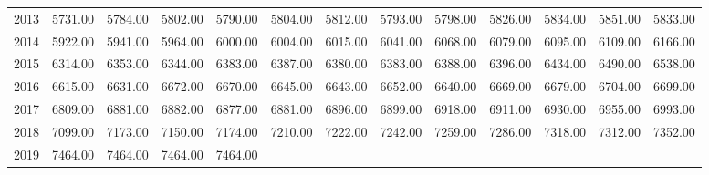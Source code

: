 \begin{longtable}{rrrrrrrrrrrrr}
  2013 & 5731.00 & 5784.00 & 5802.00 & 5790.00 & 5804.00 & 5812.00 & 5793.00 & 5798.00 & 5826.00 & 5834.00 & 5851.00 & 5833.00 \\ 
  2014 & 5922.00 & 5941.00 & 5964.00 & 6000.00 & 6004.00 & 6015.00 & 6041.00 & 6068.00 & 6079.00 & 6095.00 & 6109.00 & 6166.00 \\ 
  2015 & 6314.00 & 6353.00 & 6344.00 & 6383.00 & 6387.00 & 6380.00 & 6383.00 & 6388.00 & 6396.00 & 6434.00 & 6490.00 & 6538.00 \\ 
  2016 & 6615.00 & 6631.00 & 6672.00 & 6670.00 & 6645.00 & 6643.00 & 6652.00 & 6640.00 & 6669.00 & 6679.00 & 6704.00 & 6699.00 \\ 
  2017 & 6809.00 & 6881.00 & 6882.00 & 6877.00 & 6881.00 & 6896.00 & 6899.00 & 6918.00 & 6911.00 & 6930.00 & 6955.00 & 6993.00 \\ 
  2018 & 7099.00 & 7173.00 & 7150.00 & 7174.00 & 7210.00 & 7222.00 & 7242.00 & 7259.00 & 7286.00 & 7318.00 & 7312.00 & 7352.00 \\ 
  2019 & 7464.00 & 7464.00 & 7464.00 & 7464.00 &  &  &  &  &  &  &  &  \\ 
   \hline
\hline
\end{longtable}
